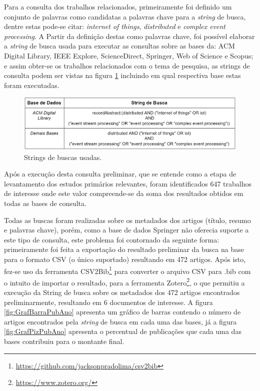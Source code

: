 \documentclass[ti,table]{texufpel} %
\begin{document}
  

Para a consulta dos trabalhos relacionados, primeiramente foi definido um conjunto de palavras como candidatas a palavras chave para a \textit{string} de busca, dentre estas pode-se citar: \textit{internet of things}, \textit{distributed} e \textit{complex event processing}. A Partir da definição destas como palavras chave, foi possível elaborar a \textit{string} de busca usada para executar as consultas sobre as bases da: ACM Digital Library, IEEE Explore, ScienceDirect, Springer, Web of Science e Scopus; e assim obter-se os trabalhos relacionados com o tema de pesquisa, as strings de consulta podem ser vistas na figura \ref{tab:stringBusca} incluindo em qual respectiva base estas foram executadas. 

  

  

  

\begin{figure}[ht] 

    \centering 

    \includegraphics[width=1\textwidth]{imagens/tabela_string_busca.png} 

    \caption{Strings de buscas usadas.} 

    \label{tab:stringBusca} 

\end{figure} 

  

Após a execução desta consulta preliminar, que se entende como a etapa de levantamento dos estudos primários relevantes, foram identificados 647 trabalhos de interesse onde este valor compreende-se da soma dos resultados obtidos em todas as bases de consulta. 

  

Todas as buscas foram realizadas sobre os metadados dos artigos (título, resumo e palavras chave), porém, como a base de dados Springer não oferecia suporte a este tipo de consulta, este problema foi contornado da seguinte forma: primeiramente foi feita a exportação do resultado preliminar da busca na base para o formato CSV (o único suportado) resultando em 472 artigos. Após isto, fez-se uso da ferramenta CSV2Bib\footnote{\url{https://github.com/jacksonpradolima/csv2bib}} para converter o arquivo CSV para .bib com o intuito de importar o resultado, para a ferramenta Zotero\footnote{\url{https://www.zotero.org/}}, o que permitiu a execução da String de busca sobre os metadados dos 472 artigos encontrados preliminarmente, resultando em 6 documentos de interesse. A figura  \ref{fig:GrafBarraPubAno} apresenta um gráfico de barras contendo o número de artigos encontrados pela \textit{string} de busca em cada uma das bases, já a figura \ref{fig:GrafPizPubAno} apresenta o percentual de publicações que cada uma das bases contribuiu para o montante final. 
\end{document}
